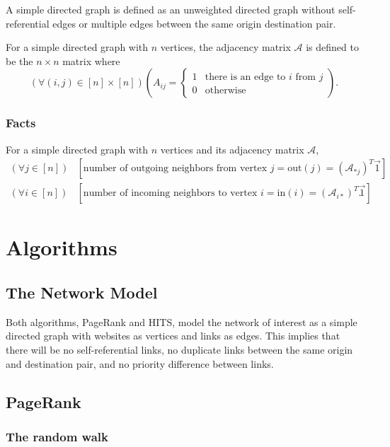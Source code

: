 \documentclass[12pt, titlepage, twoside]{amsart}
\begin{document}
A simple directed graph is defined as an unweighted directed graph without self-referential edges or multiple edges
between the same origin destination pair.

For a simple directed graph with $n$ vertices, the adjacency matrix $\mathcal{A}$ is defined to be
the $n\times n$ matrix where
\[
  (\forall (i, j)\in[n]\times[n])\left(A_{ij} = 
    \begin{cases}
      1 & \text{there is an edge to $i$ from $j$} \\
      0 & \text{otherwise}
    \end{cases}
  \right).
\]

\subsubsection{Facts}

For a simple directed graph with $n$ vertices and its adjacency matrix $\mathcal{A}$,
\begin{align*}
  (\forall j\in[n])&
  \left[\text{number of outgoing neighbors from vertex $j$} = \mathrm{out}(j) = (\mathcal{A}_{*j})^T\vec{1}\right] \\
  (\forall i\in[n])&
  \left[\text{number of incoming neighbors to vertex $i$} = \mathrm{in}(i) = (\mathcal{A}_{i*})^T\vec{1}\right].
\end{align*}

\section{Algorithms}

\subsection{The Network Model}

Both algorithms, PageRank and HITS, model the network of interest as a simple directed graph with websites as vertices
and links as edges.
This implies that there will be no self-referential links, no duplicate links between the same origin
and destination pair, and no priority difference between links.

\subsection{PageRank}

\subsubsection{The random walk}
\end{document}
